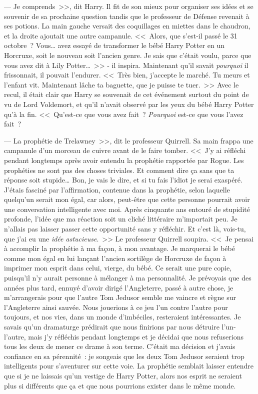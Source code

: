 --- Je comprends~>>, dit Harry. Il fit de son mieux pour organiser ses idées et se souvenir de sa prochaine question tandis que le professeur de Défense revenait à ses potions. La main gauche versait des coquillages en miettes dans le chaudron, et la droite ajoutait une autre campanule. <<~Alors, que s'est-il passé le 31 octobre~? Vous… avez essayé de transformer le bébé Harry Potter en un Horcruxe, soit le nouveau soit l'ancien genre. Je sais que c'était voulu, parce que vous avez dit à Lily Potter…~>> - il inspira. Maintenant qu'il savait \emph{pourquoi} il frissonnait, il pouvait l'endurer. <<~Très bien, j'accepte le marché. Tu meurs et l'enfant vit. Maintenant lâche ta baguette, que je puisse te tuer.~>> Avec le recul, il était clair que Harry se souvenait de cet événement surtout du point de vu de Lord Voldemort, et qu'il n'avait observé par les yeux du bébé Harry Potter qu'à la fin. <<~Qu'est-ce que vous avez fait~? \emph{Pourquoi} est-ce que vous l'avez fait~?

--- La prophétie de Trelawney~>>, dit le professeur Quirrell. Sa main frappa une campanule d'un morceau de cuivre avant de le faire tomber. <<~J'y ai réfléchi pendant longtemps après avoir entendu la prophétie rapportée par Rogue. Les prophéties ne sont pas des choses triviales. Et comment dire ça sans que ta réponse soit stupide… Bon, je vais le dire, et si tu fais l'idiot je serai exaspéré. J'étais fasciné par l'affirmation, contenue dans la prophétie, selon laquelle quelqu'un serait mon égal, car alors, peut-être que cette personne pourrait avoir une conversation intelligente avec moi. Après cinquante ans entouré de stupidité profonde, l'idée que ma réaction soit un cliché littéraire m'importait peu. Je n'allais pas laisser passer cette opportunité sans y réfléchir. Et c'est là, vois-tu, que j'ai eu une \emph{idée astucieuse}.~>> Le professeur Quirrell soupira. <<~Je pensai à accomplir la prophétie à ma façon, à mon avantage. Je marquerai le bébé comme mon égal en lui lançant l'ancien sortilège de Horcruxe de façon à imprimer mon esprit dans celui, vierge, du bébé. Ce serait une pure copie, puisqu'il n'y aurait personne à mélanger à ma personnalité. Je prévoyais que des années plus tard, ennuyé d'avoir dirigé l'Angleterre, passé à autre chose, je m'arrangerais pour que l'autre Tom Jedusor semble me vaincre et règne sur l'Angleterre ainsi sauvée. Nous jouerions à ce jeu l'un contre l'autre pour toujours, et nos vies, dans un monde d'imbéciles, resteraient intéressantes. Je savais qu'un dramaturge prédirait que nous finirions par nous détruire l'un-l'autre, mais j'y réfléchis pendant longtemps et je décidai que nous refuserions tous les deux de mener ce drame à son terme. C'était ma décision et j'avais confiance en sa pérennité~: je songeais que les deux Tom Jedusor seraient trop intelligents pour s'aventurer sur cette voie. La prophétie semblait laisser entendre que si je ne laissais qu'un vestige de Harry Potter, alors nos esprit ne seraient plus si différents que ça et que nous pourrions exister dans le même monde.

